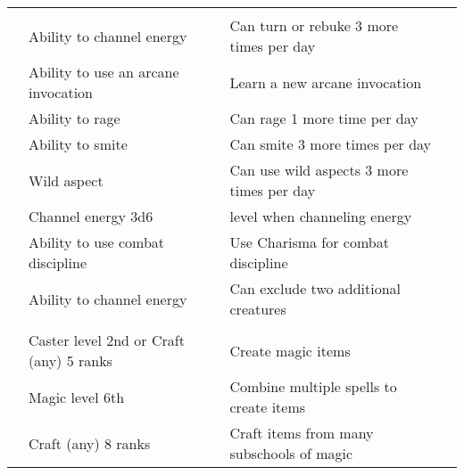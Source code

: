 {\begin{longtabu}{>{\lcol}p{15em} >{\lcol}p{15em} >{\lcol}X >{\lcol}p{10em}}
\midrule
{} &  &  \\
 & Ability to channel energy & Can turn or rebuke 3 more times per day \\
 & Ability to use an arcane invocation & Learn a new arcane invocation \\
 & Ability to rage & Can rage 1 more time per day\\
 & Ability to smite & Can smite 3 more times per day \\
 & Wild aspect & Can use wild aspects 3 more times per day \\
 & Channel energy 3d6 &  level when channeling energy \\
 & Ability to use combat discipline & Use Charisma for combat discipline \\
 & Ability to channel energy & Can exclude two additional creatures \\

\midrule
{} &  &  \\
 & Caster level 2nd or Craft (any) 5 ranks & Create magic items \\
 & Magic level 6th & Combine multiple spells to create items \\
 & Craft (any) 8 ranks & Craft items from many subschools of magic \\


\end{longtabu}}
